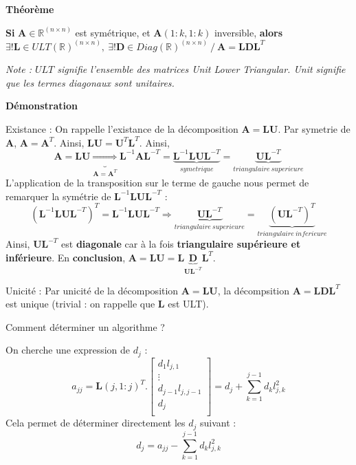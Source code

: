 \documentclass[12pt]{report}
\begin{document}
\textbf{Théorème}

\textbf{Si} $\mathbf{A} \in \mathbb{R}^{(n\times n )}$ est symétrique, et $\mathbf{A}(1:k, 1:k)$ inversible, \textbf{alors} $\exists ! \mathbf{L} \in ULT(\mathbb{R})^{(n \times n)}, ~ \exists ! \mathbf{D} \in Diag(\mathbb{R})^{(n \times n)} ~/~ \mathbf{A}= \mathbf{L} \mathbf{D} \mathbf{L}^T$

\textit{Note : $ULT$ signifie l'ensemble des matrices Unit Lower Triangular. Unit signifie que les termes diagonaux sont unitaires.}

\textbf{Démonstration}

Existance :
On rappelle l'existance de la décomposition $\mathbf{A} = \mathbf{L} \mathbf{U}$.
Par symetrie de $\mathbf{A}$, $\mathbf{A} = \mathbf{A}^T$. Ainsi, $\mathbf{L}\mathbf{U} =\mathbf{U}^T\mathbf{L}^T$.
Ainsi, 
\begin{equation}
\mathbf{A} = \mathbf{L} \mathbf{U} \underbrace{\Longrightarrow}_{\mathbf{A} = \mathbf{A}^T} \mathbf{L}^{-1} \mathbf{A} \mathbf{L}^{-T} = \underbrace{\mathbf{L}^{-1} \mathbf{L} \mathbf{U} \mathbf{L}^{-T}}_{symetrique} =  \underbrace{\mathbf{U} \mathbf{L}^{-T}}_{triangulaire ~superieure}
\end{equation}
L'application  de la transposition sur le terme de gauche nous permet de remarquer la symétrie de $ \mathbf{L}^{-1} \mathbf{L} \mathbf{U} \mathbf{L}^{-T}$ :
\begin{equation}
\left(\mathbf{L}^{-1} \mathbf{L} \mathbf{U} \mathbf{L}^{-T}\right)^T = \mathbf{L}^{-1} \mathbf{L} \mathbf{U} \mathbf{L}^{-T} \Longrightarrow \underbrace{\mathbf{U} \mathbf{L}^{-T}}_{triangulaire ~ superieure} = \underbrace{\left(\mathbf{U} \mathbf{L}^{-T}\right)^T}_{triangulaire ~ inferieure}
\end{equation}
Ainsi, $\mathbf{U} \mathbf{L}^{-T}$ est \textbf{diagonale} car à la fois \textbf{triangulaire supérieure et inférieure}.
En \textbf{conclusion}, $\mathbf{A} = \mathbf{L} \mathbf{U} = \mathbf{L} \underbrace{\mathbf{D}}_{\mathbf{U} \mathbf{L}^{-T}} \mathbf{L}^{T}$.

Unicité :
Par unicité de la décomposition $\mathbf{A} = \mathbf{L} \mathbf{U}$, la décompsition $\mathbf{A}= \mathbf{L} \mathbf{D} \mathbf{L}^T$ est unique (trivial : on rappelle que $\mathbf{L}$ est ULT).

Comment déterminer un algorithme ?

On cherche une expression de $d_j$ :
\begin{equation}
a_{jj} = \mathbf{L}(j, 1:j)^T . \begin{bmatrix}
d_1 l_{j,1} \\
\vdots \\
d_{j-1} l_{j,j-1} \\
d_{j}\\
\end{bmatrix} = d_j + \sum_{k=1}^{j-1} d_k l_{j,k}^2
\end{equation}
Cela permet de déterminer directement les $d_j$ suivant :
\begin{equation}
d_j = a_{jj} - \sum_{k=1}^{j-1} d_k l_{j,k}^2
\end{equation}
\end{document}
